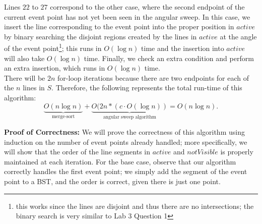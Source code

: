 \documentclass[11pt]{article}
\begin{document}
\begin{enumerate}
    Lines $22$ to $27$ correspond to the other case, where the second endpoint of the current event point has not yet been seen in the angular sweep. In this case, we insert the line corresponding to the event point into the proper position in $active$ by binary searching the disjoint regions created by the lines in $active$ at the angle of the event point\footnote{this works since the lines are disjoint and thus there are no intersections; the binary search is very similar to Lab 3 Question 1}; this runs in $O(\log n)$ time and the insertion into $active$ will also take $O(\log n)$ time. Finally, we check an extra condition and perform an extra insertion, which runs in $O(\log n)$ time.\\

    There will be $2n$ for-loop iterations because there are two endpoints for each of the $n$ lines in $S$. Therefore, the following represents the total run-time of this algorithm:
    \[\underbrace{O(n \log n)}_{\text{merge-sort}} + \underbrace{O(2n * (c \cdot O(\log n))}_{\text{angular sweep algorithm}} = O(n \log n).\]

    \textbf{Proof of Correctness:} We will prove the correctness of this algorithm using induction on the number of event points already handled; more specifically, we will show that the order of the line segments in $active$ and $notVisible$ is properly maintained at each iteration. For the base case, observe that our algorithm correctly handles the first event point; we simply add the segment of the event point to a BST, and the order is correct, given there is just one point. \\


\end{enumerate}
\end{document}
